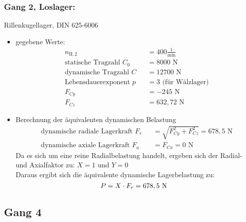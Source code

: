 \subsubsection{Gang 2, Loslager:} Rillenkugellager, DIN 625-6006\\
\begin{itemize}
	\item gegebene Werte:
	\begin{align*}
	&n_{{\mathord{\mathrm{II}},2}} &&=  400 \frac{1}{\text{min}} \\
	&\text{statische Tragzahl } C_{0} &&= 8000 \text{ N}\\
	&\text{dynamische Tragzahl } C &&= 12700 \text{ N} \\
	&\text{Lebensdauerexponent } p &&= 3 \text{ (für Wälzlager)} \\
	&F_{Cy} && = -245 \text{ N}\\
	&F_{Cz} && = 632,72 \text{ N}
	\end{align*} 
	\item Berechnung der äquivalenten dynamischen Belastung
	\begin{align*}
	&\text{dynamische radiale Lagerkraft } F_r&& = \sqrt{F_{Cy}^2 + F_{Cz}^2 } =678,5 \text{ N} \\
	&\text{dynamische axiale Lagerkraft } F_a&& = F_{Cx} = 0\text{ N}
	\end{align*} 
	Da es sich um eine reine Radialbelastung handelt, ergeben sich der Radial- und Axialfaktor zu: $X= 1$ und $Y=0$\\
	Daraus ergibt sich die äquivalente dynamische Lagerbelastung zu:  
	\[
	P= X \cdot F_r =678,5 \text{ N}
	\]
\end{itemize}
\newpage

\subsection{Gang 4}
